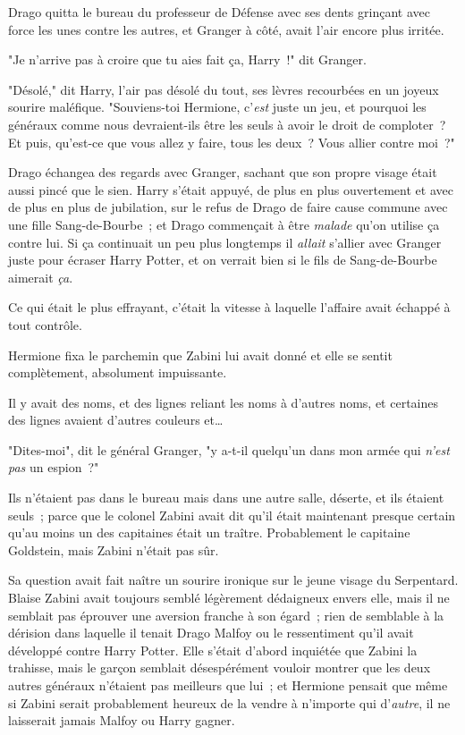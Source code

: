 Drago quitta le bureau du professeur de Défense avec ses dents grinçant avec force les unes contre les autres, et Granger à côté, avait l'air encore plus irritée.

"Je n'arrive pas à croire que tu aies fait ça, Harry~!" dit Granger.

"Désolé," dit Harry, l'air pas désolé du tout, ses lèvres recourbées en un joyeux sourire maléfique. "Souviens-toi Hermione, c'\emph{est} juste un jeu, et pourquoi les généraux comme nous devraient-ils être les seuls à avoir le droit de comploter~? Et puis, qu'est-ce que vous allez y faire, tous les deux~? Vous allier contre moi~?"

Drago échangea des regards avec Granger, sachant que son propre visage était aussi pincé que le sien. Harry s'était appuyé, de plus en plus ouvertement et avec de plus en plus de jubilation, sur le refus de Drago de faire cause commune avec une fille Sang-de-Bourbe~; et Drago commençait à être \emph{malade} qu'on utilise ça contre lui. Si ça continuait un peu plus longtemps il \emph{allait} s'allier avec Granger juste pour écraser Harry Potter, et on verrait bien si le fils de Sang-de-Bourbe aimerait \emph{ça}.

\later

Ce qui était le plus effrayant, c'était la vitesse à laquelle l'affaire avait échappé à tout contrôle.

Hermione fixa le parchemin que Zabini lui avait donné et elle se sentit complètement, absolument impuissante.

Il y avait des noms, et des lignes reliant les noms à d'autres noms, et certaines des lignes avaient d'autres couleurs et…

"Dites-moi", dit le général Granger, "y a-t-il quelqu'un dans mon armée qui \emph{n'est pas} un espion~?"

Ils n'étaient pas dans le bureau mais dans une autre salle, déserte, et ils étaient seuls~; parce que le colonel Zabini avait dit qu'il était maintenant presque certain qu'au moins un des capitaines était un traître. Probablement le capitaine Goldstein, mais Zabini n'était pas sûr.

Sa question avait fait naître un sourire ironique sur le jeune visage du Serpentard. Blaise Zabini avait toujours semblé légèrement dédaigneux envers elle, mais il ne semblait pas éprouver une aversion franche à son égard~; rien de semblable à la dérision dans laquelle il tenait Drago Malfoy ou le ressentiment qu'il avait développé contre Harry Potter. Elle s'était d'abord inquiétée que Zabini la trahisse, mais le garçon semblait désespérément vouloir montrer que les deux autres généraux n'étaient pas meilleurs que lui~; et Hermione pensait que même si Zabini serait probablement heureux de la vendre à n'importe qui d'\emph{autre}, il ne laisserait jamais Malfoy ou Harry gagner.

